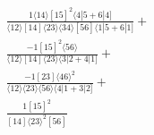 \documentclass[varwidth, border=5pt]{standalone}
\begin{document}
\begin{my}
$\begin{gathered}
\scriptscriptstyle\frac{1⟨14⟩[15]^2⟨4|5+6|4]}{⟨12⟩[14]⟨23⟩⟨34⟩[56]⟨1|5+6|1]}+\\
\scriptscriptstyle\frac{-1[15]^2⟨56⟩}{⟨12⟩[14]⟨23⟩⟨3|2+4|1]}+\\
\scriptscriptstyle\frac{-1[23]⟨46⟩^2}{⟨12⟩⟨23⟩⟨56⟩⟨4|1+3|2]}+\\
\scriptscriptstyle\frac{1[15]^2}{[14]⟨23⟩^2[56]}\phantom{+}
\end{gathered}$
\end{my}
\end{document}

